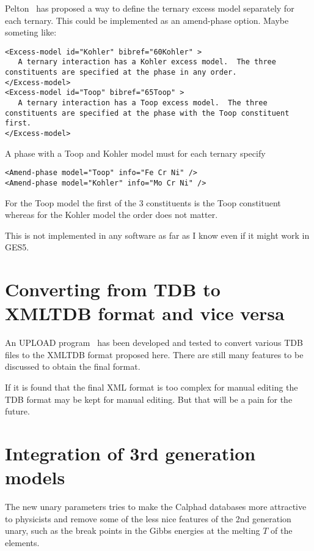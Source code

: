 \documentclass[12pt]{article}
\begin{document}
\begin{appendices}
Pelton~\cite{01Pel} has proposed a way to define the ternary excess
model separately for each ternary.  This could be implemented as an
amend-phase option.  Maybe someting like:
{\small
\begin{verbatim}
<Excess-model id="Kohler" bibref="60Kohler" >
   A ternary interaction has a Kohler excess model.  The three constituents are specified at the phase in any order.
</Excess-model>
<Excess-model id="Toop" bibref="65Toop" >
   A ternary interaction has a Toop excess model.  The three constituents are specified at the phase with the Toop constituent first.
</Excess-model>
\end{verbatim}
}

A phase with a Toop and Kohler model must for each ternary specify
{\small
\begin{verbatim}
<Amend-phase model="Toop" info="Fe Cr Ni" />
<Amend-phase model="Kohler" info="Mo Cr Ni" />
\end{verbatim}
}

For the Toop model the first of the 3 constituents is the Toop
constituent whereas for the Kohler model the order does not matter.

This is not implemented in any software as far as I know even if it
might work in GES5.


\setcounter{equation}{0}
\renewcommand{\theequation}{B\arabic{equation}} \setcounter{figure}{0}
\renewcommand{\thefigure}{B\arabic{figure}}
\section{Converting from TDB to XMLTDB format and vice versa}

An UPLOAD program~\cite{upload} has been developed and tested to
convert various TDB files to the XMLTDB format proposed here.  There
are still many features to be discussed to obtain the final format.

If it is found that the final XML format is too complex for manual
editing the TDB format may be kept for manual editing.  But that will
be a pain for the future.

\setcounter{equation}{0}
\renewcommand{\theequation}{C\arabic{equation}}
\setcounter{figure}{0}
\renewcommand{\thefigure}{C\arabic{figure}}
\section{Integration of 3rd generation models}

The new unary parameters tries to make the Calphad databases more
attractive to physicists and remove some of the less nice features of
the 2nd generation unary, such as the break points in the Gibbs
energies at the melting $T$ of the elements.


\end{appendices}
\end{document}
